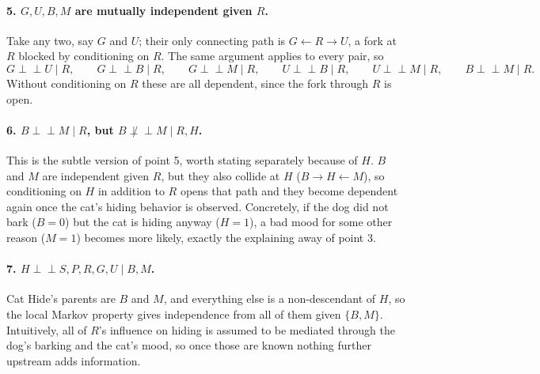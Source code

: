 \documentclass[11pt]{article}
\newcommand{\indep}{\perp\!\!\!\perp}
\begin{document}
\paragraph{5. $G,U,B,M$ are mutually independent given $R$.} Take any two, say
$G$ and $U$; their only connecting path is $G \leftarrow R \to U$, a fork at $R$
blocked by conditioning on $R$. The same argument applies to every pair, so
\[
  G \indep U \mid R, \qquad G \indep B \mid R, \qquad G \indep M \mid R, \qquad
  U \indep B \mid R, \qquad U \indep M \mid R, \qquad B \indep M \mid R.
\]
Without conditioning on $R$ these are all dependent, since the fork through $R$
is open.

\paragraph{6. $B \indep M \mid R$, but $B \not\indep M \mid R, H$.} This is the
subtle version of point 5, worth stating separately because of $H$. $B$ and $M$
are independent given $R$, but they also collide at $H$
($B \to H \leftarrow M$), so conditioning on $H$ in addition to $R$ opens that
path and they become dependent again once the cat's hiding behavior is
observed. Concretely, if the dog did not bark ($B=0$) but the cat is hiding
anyway ($H=1$), a bad mood for some other reason ($M=1$) becomes more likely,
exactly the explaining away of point 3.

\paragraph{7. $H \indep S,P,R,G,U \mid B,M$.} Cat Hide's parents are $B$ and
$M$, and everything else is a non-descendant of $H$, so the local Markov
property gives independence from all of them given $\{B,M\}$. Intuitively, all
of $R$'s influence on hiding is assumed to be mediated through the dog's
barking and the cat's mood, so once those are known nothing further upstream
adds information.
\end{document}
